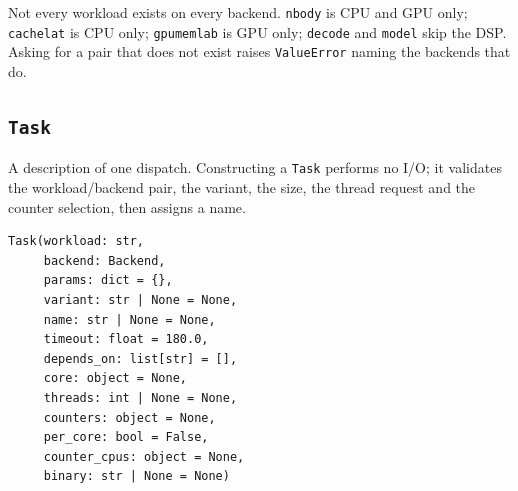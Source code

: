 \documentclass[11pt,a4paper]{article}
\newcommand{\code}[1]{\texttt{\let\_\breakableunderscore #1}}
\newcommand{\breakableunderscore}{\textunderscore\allowbreak}
\newcommand{\apient}[1]{\subsection{\texttt{#1}}}
\begin{document}
\noindent Not every workload exists on every backend. \code{nbody} is CPU and
GPU only; \code{cachelat} is CPU only; \code{gpu\_memlab} is GPU only; \code{decode} and \code{model} skip the
DSP. Asking for a pair that does not exist raises \code{ValueError} naming the
backends that do.

\apient{Task}
\label{sec:task}

A description of one dispatch. Constructing a \code{Task} performs no I/O; it
validates the workload/backend pair, the variant, the size, the thread request
and the counter selection, then assigns a name.

\begin{lstlisting}
Task(workload: str,
     backend: Backend,
     params: dict = {},
     variant: str | None = None,
     name: str | None = None,
     timeout: float = 180.0,
     depends_on: list[str] = [],
     core: object = None,
     threads: int | None = None,
     counters: object = None,
     per_core: bool = False,
     counter_cpus: object = None,
     binary: str | None = None)
\end{lstlisting}
\end{document}
